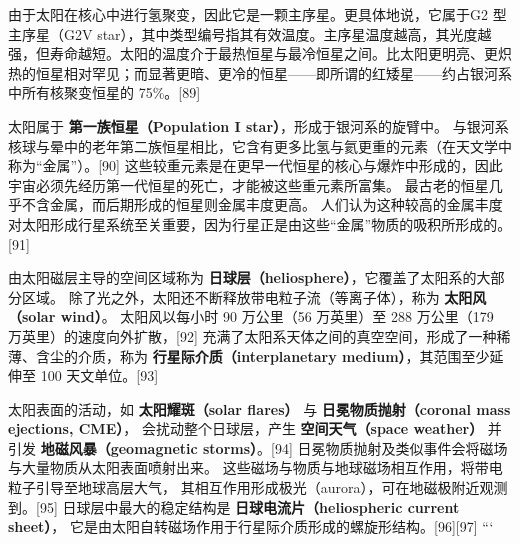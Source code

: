 由于太阳在核心中进行氢聚变，因此它是一颗主序星。更具体地说，它属于G2 型主序星（G2V star），其中类型编号指其有效温度。主序星温度越高，其光度越强，但寿命越短。太阳的温度介于最热恒星与最冷恒星之间。比太阳更明亮、更炽热的恒星相对罕见；而显著更暗、更冷的恒星——即所谓的红矮星——约占银河系中所有核聚变恒星的 75\%。[89]

太阳属于 \textbf{第一族恒星（Population I star）}，形成于银河系的旋臂中。  
与银河系核球与晕中的老年第二族恒星相比，它含有更多比氢与氦更重的元素（在天文学中称为“金属”）。[90]  
这些较重元素是在更早一代恒星的核心与爆炸中形成的，因此宇宙必须先经历第一代恒星的死亡，才能被这些重元素所富集。  
最古老的恒星几乎不含金属，而后期形成的恒星则金属丰度更高。  
人们认为这种较高的金属丰度对太阳形成行星系统至关重要，因为行星正是由这些“金属”物质的吸积所形成的。[91]

由太阳磁层主导的空间区域称为 \textbf{日球层（heliosphere）}，它覆盖了太阳系的大部分区域。  
除了光之外，太阳还不断释放带电粒子流（等离子体），称为 \textbf{太阳风（solar wind）}。  
太阳风以每小时 90 万公里（56 万英里）至 288 万公里（179 万英里）的速度向外扩散，[92]  
充满了太阳系天体之间的真空空间，形成了一种稀薄、含尘的介质，称为 \textbf{行星际介质（interplanetary medium）}，其范围至少延伸至 100 天文单位。[93]

太阳表面的活动，如 \textbf{太阳耀斑（solar flares）} 与 \textbf{日冕物质抛射（coronal mass ejections, CME）}，  
会扰动整个日球层，产生 \textbf{空间天气（space weather）} 并引发 \textbf{地磁风暴（geomagnetic storms）}。[94]  
日冕物质抛射及类似事件会将磁场与大量物质从太阳表面喷射出来。  
这些磁场与物质与地球磁场相互作用，将带电粒子引导至地球高层大气，  
其相互作用形成极光（aurora），可在地磁极附近观测到。[95]  
日球层中最大的稳定结构是 \textbf{日球电流片（heliospheric current sheet）}，  
它是由太阳自转磁场作用于行星际介质形成的螺旋形结构。[96][97]
```


